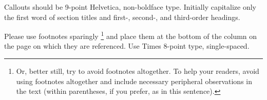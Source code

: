 \documentclass[times, 10pt,twocolumn]{article}
\begin{document}
\noindent Callouts should be 9-point Helvetica, non-boldface type. 
Initially capitalize only the first word of section titles and first-, 
second-, and third-order headings.


Please use footnotes sparingly%
\footnote
   {%
     Or, better still, try to avoid footnotes altogether.  To help your 
     readers, avoid using footnotes altogether and include necessary 
     peripheral observations in the text (within parentheses, if you 
     prefer, as in this sentence).
   }
and place them at the bottom of the column on the page on which they are 
referenced. Use Times 8-point type, single-spaced.


\nocite{ex1,ex2}


\end{document}
